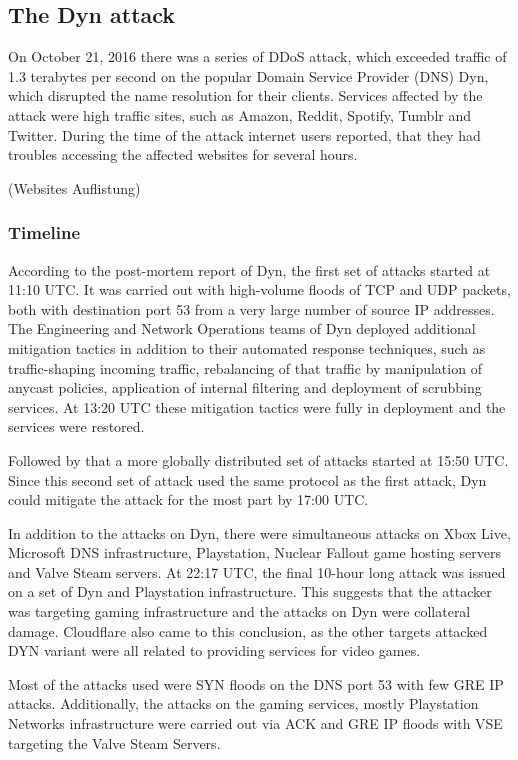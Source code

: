 	\subsection{The Dyn attack}
	On October 21, 2016 there was a series of DDoS attack, which exceeded traffic of 1.3 terabytes per second on the popular Domain Service Provider (DNS) Dyn, which disrupted the name resolution for their clients. Services affected by the attack were high traffic sites, such as Amazon, Reddit, Spotify, Tumblr and Twitter. During the time of the attack internet users reported, that they had troubles accessing the affected websites for several hours.\cite{Moss16}
	
	(Websites Auflistung)
	
		\subsubsection{Timeline}
		According to the post-mortem report of Dyn, the first set of attacks started at 11:10 UTC. It was carried out with high-volume floods of TCP and UDP packets, both with destination port 53 from a very large number of source IP addresses. The Engineering and Network Operations teams of Dyn deployed additional mitigation tactics in addition to their automated response techniques, such as traffic-shaping incoming traffic, rebalancing of that traffic by manipulation of anycast policies, application of internal filtering and deployment of scrubbing services. At 13:20 UTC these mitigation tactics were fully in deployment and the services were restored. \cite{Dyn16}
		
Followed by that a more globally distributed set of attacks started at 15:50 UTC. Since this second set of attack used the same protocol as the first attack, Dyn could mitigate the attack for the most part by 17:00 UTC. \cite{Dyn16}
 
In addition to the attacks on Dyn, there were simultaneous attacks on Xbox Live, Microsoft DNS infrastructure, Playstation, Nuclear Fallout game hosting servers and Valve Steam servers. At 22:17 UTC, the final 10-hour long attack was issued on a set of Dyn and Playstation infrastructure. \cite{Antonakakis17}
This suggests that the attacker was targeting gaming infrastructure and the attacks on Dyn were collateral damage. Cloudflare also came to this conclusion, as the other targets attacked DYN variant were all related to providing services for video games. \cite{Cloudflare17}

Most of the attacks used were SYN floods on the DNS port 53 with few GRE IP attacks. Additionally, the attacks on the gaming services, mostly Playstation Networks infrastructure were carried out via ACK and GRE IP floods with VSE targeting the Valve Steam Servers. \cite{Antonakakis17}

